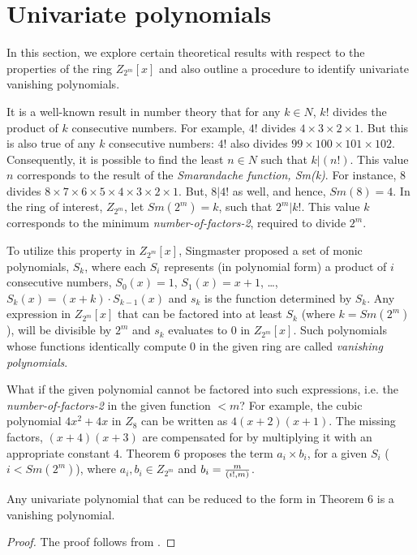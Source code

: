 \section{Univariate polynomials} \label{sec:sing}
In this section, we explore certain theoretical results with respect
to the properties of the ring $Z_{2^m}[x]$ and also outline a
procedure to identify univariate vanishing polynomials.

It is a well-known result in number theory that \cite{niven} for any
$k \in N$, $k!$ divides the product of $k$ consecutive numbers. For
example, $4!$ divides $4 \times 3 \times 2 \times 1$. But this is also
true of any $k$ consecutive numbers: $4!$ also divides $99 \times 100
\times 101 \times 102$. Consequently, it is possible to find the least
$n \in N$ such that $k | (n!)$. This value $n$ corresponds to the
result of the \textit{Smarandache function, Sm(k)}. For instance, $8$
divides $8 \times 7 \times 6 \times 5 \times 4 \times 3 \times 2
\times 1$. But, $8|4!$ as well, and hence, $Sm(8) = 4$. In the ring of
interest, $Z_{2^m}$, let $Sm(2^m) = k$, such that $2^m|k!$. This value
$k$ corresponds to the minimum \textit{number-of-factors-2}, required
to divide $2^m$.

To utilize this property in $Z_{2^m}[x]$, Singmaster \cite{singmaster}
proposed a set of monic polynomials, $S_k$, where each $S_i$
represents (in polynomial form) a product of $i$ consecutive numbers,
$S_0(x) = 1$, $S_1(x) = x + 1$, \ldots, $S_k(x) = (x+k)\cdot
S_{k-1}(x)$ and $s_k$ is the function determined by $S_k$. Any
expression in $Z_{2^m}[x]$ that can be factored into at least $S_{k}$
(where $k = Sm(2^m)$), will be divisible by $2^m$ and $s_k$ evaluates
to $0$ in $Z_{2^m}[x]$. Such polynomials whose functions identically
compute $0$ in the given ring are called \textit{vanishing
polynomials}.

What if the given polynomial cannot be factored into such expressions,
i.e. the \textit{number-of-factors-2} in the given function $< m$? For
example, the cubic polynomial $4x^2+4x$ in $Z_8$ can be written as
$4(x+2)(x+1)$. The missing factors, $(x+4)(x+3)$ are compensated for
by multiplying it with an appropriate constant $4$. Theorem $6$
\cite{singmaster} proposes the term $a_i \times b_i$, for a given
$S_i$ ($i<Sm(2^m)$), where $a_i, b_i \in Z_{2^m}$ and $b_i = {m\over
(i!, m)}$.

\begin{theorem} \label{uni}
 Any univariate polynomial that can be reduced to the form in Theorem
 6 \cite{singmaster} is a vanishing polynomial.
\end{theorem}
\begin{proof}
The proof follows from \cite{singmaster}.
\end{proof}

